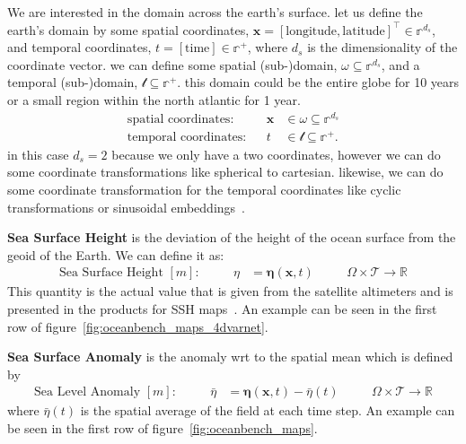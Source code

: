 We are interested in the domain across the earth's surface.
let us define the earth's domain by some spatial coordinates, $\mathbf{x} = [\text{longitude},\text{latitude}]^\top \in\mathbb{r}^{d_s}$, and temporal coordinates, $t=[\text{time}]\in\mathbb{r}^+$, where $d_s$ is the dimensionality of the coordinate vector.
we can define some spatial (sub-)domain, $\omega\subseteq\mathbb{r}^{d_s}$, and a temporal (sub-)domain, $\mathcal{t}\subseteq\mathbb{r}^+$.
this domain could be the entire globe for 10 years or a small region within the north atlantic for 1 year.
\begin{align}  \label{eq:spatiotemporal_coords}
    \text{spatial coordinates}: && \mathbf{x} &\in \omega \subseteq \mathbb{r}^{d_s}\\
    \text{temporal coordinates}: && t &\in \mathcal{t} \subseteq \mathbb{r}^+.
\end{align}
in this case $d_s=2$ because we only have a two coordinates, however we can do some coordinate transformations like spherical to cartesian. likewise, we can do some coordinate transformation for the temporal coordinates like cyclic transformations or sinusoidal embeddings~\cite{attention}.

\textbf{Sea Surface Height} is the deviation of the height of the ocean surface from the geoid of the Earth. We can define it as:
\begin{align}
	\text{Sea Surface Height }[m]:&& \quad
 \eta &= \boldsymbol{\eta}(\mathbf{x},t)&& \quad \Omega\times \mathcal{T}\rightarrow\mathbb{R} \label{eq:ssh}
\end{align}
This quantity is the actual value that is given from the satellite altimeters and is presented in the products for SSH maps~\cite{DUACS}. An example can be seen in the first row of figure~\ref{fig:oceanbench_maps_4dvarnet}.

\textbf{Sea Surface Anomaly} is the anomaly wrt to the spatial mean which is defined by
\begin{align}
	\text{Sea Level Anomaly }[m]:&& \quad
 \bar{\eta} &= \boldsymbol{\eta}(\mathbf{x},t) - \bar{\eta}(t) &&
 \quad \Omega\times \mathcal{T}\rightarrow\mathbb{R} \label{eq:sla}
\end{align}
where $\bar{\eta}(t)$ is the spatial average of the field at each time step.  
An example can be seen in the first row of figure~\ref{fig:oceanbench_maps}.

